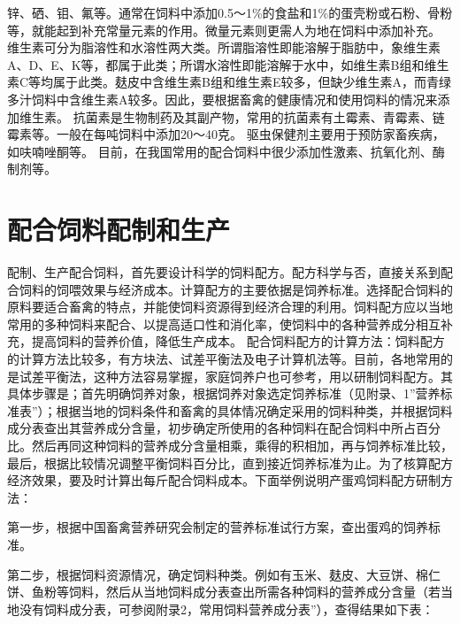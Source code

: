 \documentclass{ctexbook}
\begin{document}
锌、硒、钼、氟等。通常在饲料中添加0.5〜1\%的食盐和1\%的蛋壳粉或石粉、骨粉等，就能起到补充常量元素的作用。微量元素则更需人为地在饲料中添加补充。
维生素可分为脂溶性和水溶性两大类。所谓脂溶性即能溶解于脂肪中，象维生素A、D、E、K等，都属于此类；所谓水溶性即能溶解于水中，如维生素B组和维生素C等均属于此类。麸皮中含维生素B组和维生素E较多，但缺少维生素A，而青绿多汁饲料中含维生素A较多。因此，要根据畜禽的健康情况和使用饲料的情况来添加维生素。
抗菌素是生物制药及其副产物，常用的抗菌素有土霉素、青霉素、链霉素等。一般在每吨饲料中添加20〜40克。
驱虫保健剂主要用于预防家畜疾病，如呋喃唑酮等。
目前，在我国常用的配合饲料中很少添加性激素、抗氧化剂、酶制剂等。
\section{配合饲料配制和生产}
配制、生产配合饲料，首先要设计科学的饲料配方。配方科学与否，直接关系到配合饲料的饲喂效果与经济成本。计算配方的主要依据是饲养标准。选择配合饲料的原料要适合畜禽的特点，并能使饲料资源得到经济合理的利用。饲料配方应以当地常用的多种饲料来配合、以提高适口性和消化率，使饲料中的各种营养成分相互补充，提高饲料的营养价值，降低生产成本。
配合饲料配方的计算方法：饲料配方的计算方法比较多，有方块法、试差平衡法及电子计算机法等。目前，各地常用的是试差平衡法，这种方法容易掌握，家庭饲养户也可参考，用以研制饲料配方。其具体步骤是；首先明确饲养对象，根据饲养对象选定饲养标准（见附录、1”营养标准表”）；根据当地的饲料条件和畜禽的具体情况确定采用的饲料种类，并根据饲料成分表查出其营养成分含量，初步确定所使用的各种饲料在配合饲料中所占百分比。然后再同这种饲料的营养成分含量相乘，乘得的积相加，再与饲养标准比较，最后，根据比较情况调整平衡饲料百分比，直到接近饲养标准为止。为了核算配方经济效果，要及时计算出每斤配合饲料成本。下面举例说明产蛋鸡饲料配方研制方法：

第一步，根据中国畜禽营养研究会制定的营养标准试行方案，查出蛋鸡的饲养标准。

第二步，根据饲料资源情况，确定饲料种类。例如有玉米、麸皮、大豆饼、棉仁饼、鱼粉等饲料，然后从当地饲料成分表查出所需各种饲料的营养成分含量（若当地没有饲料成分表，可参阅附录2，常用饲料营养成分表”），查得结果如下表：
\end{document}
